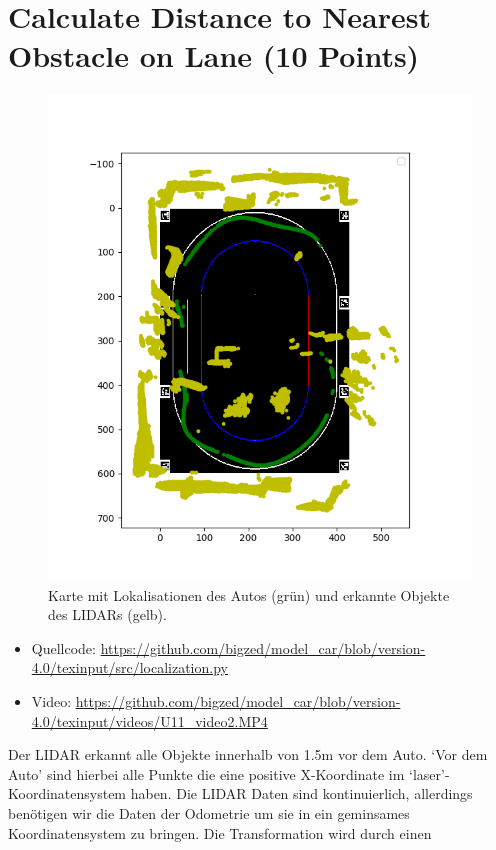 \documentclass[10pt,oneside,a4paper]{article}
\begin{document}
  \section{Calculate Distance to Nearest Obstacle on Lane (10 Points)}
    \begin{figure}[h]
      \centering
      \includegraphics[scale=0.7]{pictures/circle_with_car_and_obstacles.png}
      \caption{Karte mit Lokalisationen des Autos (grün) und erkannte Objekte des LIDARs (gelb). }
    \end{figure}
    \begin{itemize}
      \item Quellcode: \url{https://github.com/bigzed/model_car/blob/version-4.0/texinput/src/localization.py}
      \item Video: \url{https://github.com/bigzed/model_car/blob/version-4.0/texinput/videos/U11_video2.MP4}
    \end{itemize}

	  Der LIDAR erkannt alle Objekte innerhalb von 1.5m vor dem Auto. `Vor dem Auto'  sind
    hierbei alle Punkte die eine positive X-Koordinate im `laser'-Koordinatensystem haben. Die
    LIDAR Daten sind kontinuierlich, allerdings ben\"otigen wir die Daten der Odometrie um sie
    in ein geminsames Koordinatensystem zu bringen. Die Transformation wird durch einen
\end{document}
